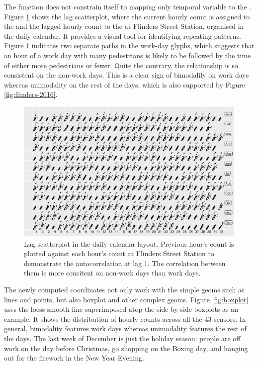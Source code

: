 \documentclass[article]{jss}
\begin{document}
The  function does not constrain itself to mapping
only temporal variable to the . Figure \ref{fig:scatterplot}
shows the lag scatterplot, where the current hourly count is assigned to
the  and the lagged hourly count to the  at Flinders
Street Station, organised in the daily calendar. It provides a visual
tool for identifying repeating patterns. Figure \ref{fig:scatterplot}
indicates two separate paths in the work-day glyphs, which suggests that
an hour of a work day with many pedestrians is likely to be followed by
the time of either more pedestrians or fewer. Quite the contrary, the
relationship is so consistent on the non-work days. This is a clear sign
of bimodalily on work days whereas unimodality on the rest of the days,
which is also supported by Figure \ref{fig:flinders-2016}.

\begin{CodeChunk}
\begin{figure}

{\centering \includegraphics[width=\textwidth]{figure/scatterplot-1} 

}

\caption[Lag scatterplot in the daily calendar layout]{Lag scatterplot in the daily calendar layout. Previous hour's count is plotted against each hour's count at Flinders Street Station to demonstrate the autocorrelation at lag 1. The correlation between them is more consitent on non-work days than work days.}\label{fig:scatterplot}
\end{figure}
\end{CodeChunk}

The newly computed coordinates not only work with the simple geoms such
as lines and points, but also boxplot and other complex geoms. Figure
\ref{fig:boxplot} uses the loess smooth line superimposed atop the
side-by-side boxplots as an example. It shows the distribution of hourly
counts across all the 43 sensors. In general, bimodality features work
days whereas unimodality features the rest of the days. The last week of
December is just the holiday season: people are off work on the day
before Christmas, go shopping on the Boxing day, and hanging out for the
firework in the New Year Evening.
\end{document}
